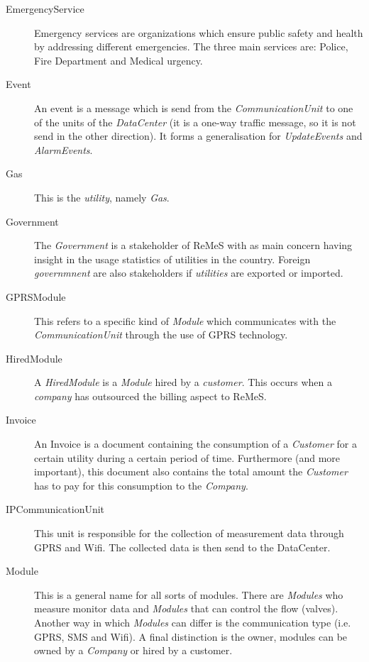 \begin{description}
\item[EmergencyService] Emergency services are organizations which ensure public
safety and health by addressing different emergencies. The three main services
are: Police, Fire Department and Medical urgency.

\item[Event] An event is a message which is send from the
\emph{CommunicationUnit} to one of the units of the \emph{DataCenter} (it is a
one-way traffic message, so it is not send in the other direction). It forms a
generalisation for \emph{UpdateEvents} and \emph{AlarmEvents}.

\item[Gas] This is the \emph{utility}, namely \emph{Gas}.

\item[Government] The \emph{Government} is a stakeholder of ReMeS with as main
concern having insight in the usage statistics of utilities in the country.
Foreign \emph{governmnent} are also stakeholders if \emph{utilities} are
exported or imported.

\item[GPRSModule] This refers to a specific kind of \emph{Module} which
communicates with the \emph{CommunicationUnit} through the use of GPRS
technology.

\item[HiredModule] A \emph{HiredModule} is a \emph{Module} hired by a
\emph{customer}. This occurs when a \emph{company} has outsourced the billing
aspect to ReMeS.

\item[Invoice] An Invoice is a document containing the consumption of a
\emph{Customer} for a certain utility during a certain period of time.
Furthermore (and more important), this document also contains the total amount
the \emph{Customer} has to pay for this consumption to the \emph{Company}.

\item[IPCommunicationUnit] This unit is responsible for the collection of
measurement data through GPRS and Wifi. The collected data is then send to the
DataCenter.

\item[Module] This is a general name for all sorts of modules.
There are \emph{Modules} who measure monitor data and \emph{Modules} that can
control the flow (valves). Another way in which \emph{Modules} can differ is the
communication type (i.e. GPRS, SMS and Wifi). A final distinction is the owner,
modules can be owned by a \emph{Company} or hired by a customer.


\end{description}
